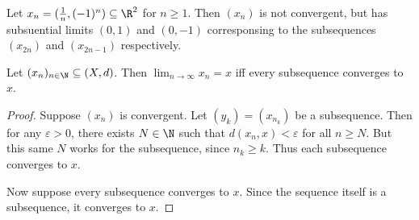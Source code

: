\begin{example}
    Let $x_n = (\frac1n, (-1)^n) \subseteq \R^2$ for $n \ge 1$.
    Then $(x_n)$ is not convergent, but has subsuential limits $(0, 1)$ and
    $(0, -1)$ corresponsing to the subsequences $(x_{2n})$ and $(x_{2n-1})$
    respectively.
\end{example}

\begin{theorem}
    Let $(x_n)_{n \in \N} \subseteq (X, d)$.
    Then $\lim_{n \to \infty} x_n = x$ iff every subsequence converges to
    $x$.
\end{theorem}
\begin{proof}
    Suppose $(x_n)$ is convergent.
    Let $(y_k) = (x_{n_k})$ be a subsequence.
    Then for any $\varepsilon > 0$, there exists $N \in \N$ such that
    $d(x_n, x) < \varepsilon$ for all $n \ge N$.
    But this same $N$ works for the subsequence, since $n_k \ge k$.
    Thus each subsequence converges to $x$.

    Now suppose every subsequence converges to $x$.
    Since the sequence itself is a subsequence, it converges to $x$.
\end{proof}

